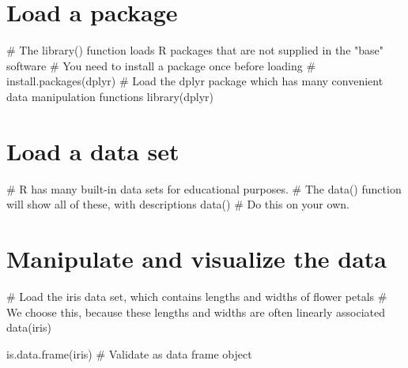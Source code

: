 \documentclass[
  letterpaper,
  DIV=11,
  numbers=noendperiod]{scrreprt}
\newenvironment{Shaded}{\begin{snugshade}}{\end{snugshade}}
\newcommand{\CommentTok}[1]{\textcolor[rgb]{0.37,0.37,0.37}{#1}}
\newcommand{\FunctionTok}[1]{\textcolor[rgb]{0.28,0.35,0.67}{#1}}
\newcommand{\NormalTok}[1]{\textcolor[rgb]{0.00,0.23,0.31}{#1}}
\begin{document}
\hypertarget{load-a-package}{%
\section{Load a package}\label{load-a-package}}

\begin{Shaded}
\begin{Highlighting}[]
\CommentTok{\# The library() function loads R packages that are not supplied in the "base" software}
\CommentTok{\# You need to install a package once before loading}
\CommentTok{\# install.packages(\textquotesingle{}dplyr\textquotesingle{})}
\CommentTok{\# Load the \textquotesingle{}dplyr\textquotesingle{} package which has many convenient data manipulation functions}
\FunctionTok{library}\NormalTok{(dplyr) }
\end{Highlighting}
\end{Shaded}

\hypertarget{load-a-data-set}{%
\section{Load a data set}\label{load-a-data-set}}

\begin{Shaded}
\begin{Highlighting}[]
\CommentTok{\# R has many built{-}in data sets for educational purposes.}
\CommentTok{\# The data() function will show all of these, with descriptions}
\FunctionTok{data}\NormalTok{() }\CommentTok{\# Do this on your own.}
\end{Highlighting}
\end{Shaded}

\hypertarget{manipulate-and-visualize-the-data}{%
\section{Manipulate and visualize the
data}\label{manipulate-and-visualize-the-data}}

\begin{Shaded}
\begin{Highlighting}[]
\CommentTok{\# Load the \textquotesingle{}iris\textquotesingle{} data set, which contains lengths and widths of flower petals}
\CommentTok{\# We choose this, because these lengths and widths are often linearly associated}
\FunctionTok{data}\NormalTok{(iris)}

\FunctionTok{is.data.frame}\NormalTok{(iris) }\CommentTok{\# Validate as data frame object}
\end{Highlighting}
\end{Shaded}
\end{document}
